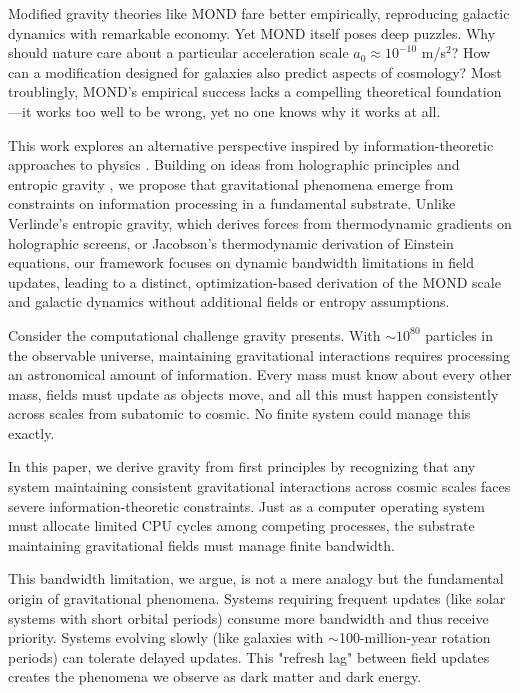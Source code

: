 \documentclass[twocolumn,prd,amsmath,amssymb,aps,superscriptaddress,nofootinbib]{revtex4-2}
\begin{document}
Modified gravity theories like MOND \cite{Milgrom1983} fare better empirically, reproducing galactic dynamics with remarkable economy. Yet MOND itself poses deep puzzles. Why should nature care about a particular acceleration scale $a_0 \approx 10^{-10}$ m/s$^2$? How can a modification designed for galaxies also predict aspects of cosmology? Most troublingly, MOND's empirical success lacks a compelling theoretical foundation---it works too well to be wrong, yet no one knows why it works at all.

This work explores an alternative perspective inspired by information-theoretic approaches to physics \cite{Wheeler1990, Lloyd2002}. Building on ideas from holographic principles \cite{tHooft1993, Susskind1995} and entropic gravity \cite{Verlinde2011, Jacobson1995}, we propose that gravitational phenomena emerge from constraints on information processing in a fundamental substrate. Unlike Verlinde's entropic gravity, which derives forces from thermodynamic gradients on holographic screens, or Jacobson's thermodynamic derivation of Einstein equations, our framework focuses on dynamic bandwidth limitations in field updates, leading to a distinct, optimization-based derivation of the MOND scale and galactic dynamics without additional fields or entropy assumptions.

Consider the computational challenge gravity presents. With $\sim 10^{80}$ particles in the observable universe, maintaining gravitational interactions requires processing an astronomical amount of information. Every mass must know about every other mass, fields must update as objects move, and all this must happen consistently across scales from subatomic to cosmic. No finite system could manage this exactly.

In this paper, we derive gravity from first principles by recognizing that any system maintaining consistent gravitational interactions across cosmic scales faces severe information-theoretic constraints. Just as a computer operating system must allocate limited CPU cycles among competing processes, the substrate maintaining gravitational fields must manage finite bandwidth.

This bandwidth limitation, we argue, is not a mere analogy but the fundamental origin of gravitational phenomena. Systems requiring frequent updates (like solar systems with short orbital periods) consume more bandwidth and thus receive priority. Systems evolving slowly (like galaxies with $\sim$100-million-year rotation periods) can tolerate delayed updates. This "refresh lag" between field updates creates the phenomena we observe as dark matter and dark energy.
\end{document}
